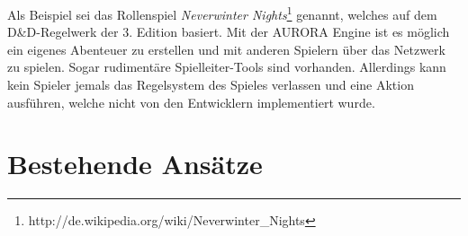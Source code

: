 Als Beispiel sei das Rollenspiel \emph{Neverwinter Nights}\footnote{http://de.wikipedia.org/wiki/Neverwinter\_Nights} genannt, welches auf dem D\&D-Regelwerk der 3. Edition basiert. Mit der AURORA Engine ist es möglich ein eigenes Abenteuer zu erstellen und mit anderen Spielern über das Netzwerk zu spielen. Sogar rudimentäre Spielleiter-Tools sind vorhanden. Allerdings kann kein Spieler jemals das Regelsystem des Spieles verlassen und eine Aktion ausführen, welche nicht von den Entwicklern implementiert wurde.\cite{Tychsen2006a}



\section{Bestehende Ansätze}
\label{sec:BekannteAnsaetze}

